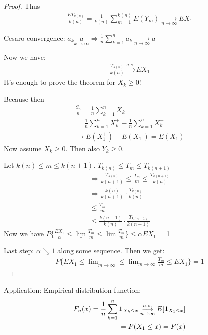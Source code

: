 \documentclass[11pt]{article}
\begin{document}
\begin{proof}
    Thus 
    \begin{align*}
        \frac{ET_{k(n)}}{k(n)} = \frac{1}{k(n)}\sum_{m=1}^{k(n)}E(Y_m) \underset{n \longrightarrow \infty}
        {\longrightarrow}EX_1
    \end{align*}
    \begin{remark}
        Cesaro convergence: $a_k \underset{k \longrightarrow \infty}{a} \Longrightarrow
        \frac{1}{n}\sum_{k=1}^{n}a_k \underset{n\to\infty}{\longrightarrow} a$
    \end{remark}
    Now we have: 
    \begin{align*}
        \frac{T_{k(n)}}{k(n)} \overset{a.s.}{\longrightarrow} EX_1
    \end{align*}
    It's enough to prove the theorem for $X_k \ge 0$!

    Because then 
    \begin{align*}
        \frac{S_n}{n} = \frac{1}{n}\sum_{k=1}^{n}X_k \\
        = \frac{1}{n}\sum_{k=1}^{n}X_{k}^{+} - \frac{1}{n}\sum_{k=1}^{n}X_{k}^{-}\\
        \longrightarrow E(X_1^{+}) - E(X_1^{-}) = E(X_1)
    \end{align*}
    Now assume $X_k \ge 0$. Then also $Y_k \ge 0$.

    Let $k(n) \le m \le k(n+1)$. $T_{k(n)} \le T_m \le T_{k(n+1)}$
    \begin{align*}
        \Longrightarrow \frac{T_{k(n)}}{k(n+1)} \le \frac{T_m}{m}  \le \frac{T_{k(n+1)}}{k(n)}\\
        \Longrightarrow \frac{k(n)}{k(n+1)} \cdot \frac{T_{k(n)}}{k(n)} \\
        \le \frac{T_m}{m} \\
        \le \frac{k(n+1)}{k(n)} \cdot \frac{T_{k(n+1)}}{k(n+1)}
    \end{align*}
    Now we have $P\{ \frac{EX_1}{\alpha} \le 
        \underline{\lim}\frac{T_m}{m} \le \overline{\lim}\frac{T_m}{m} \}
        \le \alpha EX_1
        $ = 1

    Last step: $\alpha \searrow 1$ along some sequence. Then we get:
    \begin{align*}
        P \{ EX_1 \le \underline{\lim}_{m \to \infty} \le 
        \overline{\lim}_{m \to \infty} \frac{T_m}{m} \le EX_1 \} = 1
    \end{align*}
\end{proof}

Application: Empirical distribution function:
\begin{align*}
    F_n(x) = \frac{1}{n}\sum_{k=1}^{n} \bm{1}_{X_k \le x} \overset{a.s.}{\underset{n \to \infty}{\longrightarrow}} 
    E[\bm{1}_{X_1 \le x}]\\
    = P(X_1 \le x) = F(x)
\end{align*}
\end{document}
